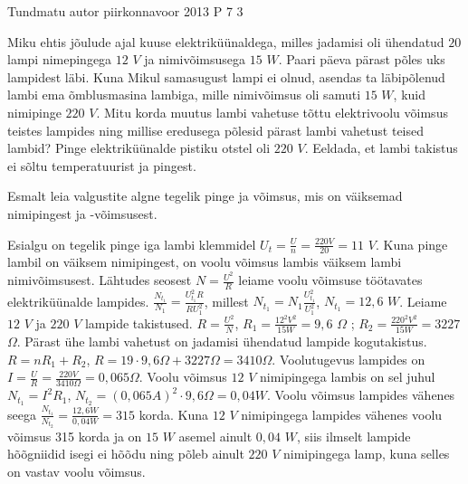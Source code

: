 {Tundmatu autor} %
{piirkonnavoor} %
{2013} %
{P 7} %
{3} %
{

\ifStatement
Miku ehtis jõulude ajal kuuse elektriküünaldega, milles jadamisi oli ühendatud $20$ lampi nimepingega $12$ $V$ ja nimivõimsusega $15$ $W$. Paari päeva pärast põles uks lampidest läbi. Kuna Mikul samasugust lampi ei olnud, asendas ta läbipõlenud lambi ema õmblusmasina lambiga, mille nimivõimsus oli samuti $15$ $W$, kuid nimipinge $220$ $V$. Mitu korda muutus lambi vahetuse tõttu elektrivoolu võimsus teistes lampides ning millise eredusega põlesid pärast lambi vahetust teised lambid? Pinge elektriküünalde pistiku otstel oli $220$ $V$. Eeldada, et lambi takistus ei sõltu temperatuurist ja pingest.

\ifHint
Esmalt leia valgustite algne tegelik pinge ja võimsus, mis on väiksemad nimipingest ja -võimsusest.
\fi

\ifSolution
Esialgu on tegelik pinge iga lambi klemmidel $U_t = \frac{U}{n} = \frac{220V}{20} = 11$ $V$.
Kuna pinge lambil on väiksem nimipingest, on voolu võimsus lambis väiksem lambi nimivõimsusest. Lähtudes seosest $N = \frac{U^2}{R}$ leiame voolu võimsuse töötavates elektriküünalde lampides. $\frac{N_{t_1}}{N_1} = \frac{U^2 _{t_1} R}{RU^2 _1}$,  millest $N_{t_1} = N_1 \frac{U^2 _{t_1}}{U^2_1}$, $N_{t_1} = 12,6$ $W$. 
Leiame $12$ $V$ ja $220$ $V$ lampide takistused.
$R = \frac{U^2}{N}$, $R_1 = \frac{12^2 V^2}{15 W} = 9,6$ $\Omega$ ; $R_2 = \frac{220^2 V^2}{15 W} = 3227$ $\Omega$.
Pärast ühe lambi vahetust on jadamisi ühendatud lampide kogutakistus.
$R = n R_1 + R_2$, $R = 19 \cdot 9,6 \Omega + 3227 \Omega = 3410 \Omega$.
Voolutugevus lampides on $I = \frac{U}{R} = \frac{220 V}{3410 \Omega} = 0,065 \Omega$.
Voolu võimsus $12$ $V$ nimipingega lambis on sel juhul $N_{t_1} = I^2 R_1$, $N_{t_2} = (0,065A)^2 \cdot 9,6 \Omega = 0,04W$.
Voolu võimsus lampides vähenes seega $\frac{N_{t_1}}{N_{t_2}} = \frac{12,6 W}{0,04W} = 315 $ korda.
Kuna $12$ $V$ nimipingega lampides vähenes voolu võimsus 315 korda ja on $15$ $W$ asemel ainult $0,04$ $W$, siis ilmselt lampide hõõgniidid isegi ei hõõdu ning põleb ainult $220$ $V$ nimipingega lamp, kuna selles on vastav voolu võimsus.
\fi
}
